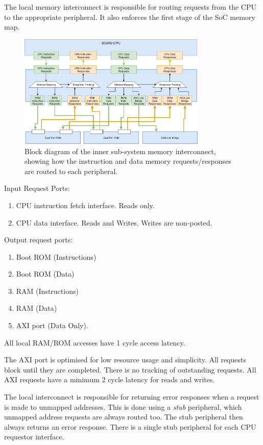 
The local memory interconnect is responsible for routing requests from the
CPU to the appropriate peripheral.
It also enforces the first stage of the SoC memory map.

\begin{figure}
\centering
\includegraphics[width=0.8\textwidth]{image/soc-local-ic.png}
\caption{
Block diagram of the \SCARVSOC inner sub-system memory interconnect, 
showing how the \SCARVCPU instruction and data memory requests/responses
are routed to each peripheral.
}
\label{fig:design:soc-local-ic}
\end{figure}

\noindent Input Request Ports:
\begin{enumerate}

\item CPU instruction fetch interface. Reads only.

\item CPU data interface. Reads and Writes. Writes are non-posted.

\end{enumerate}


\noindent Output request ports:
\begin{enumerate}

\item Boot ROM (Instructions)

\item Boot ROM (Data)

\item RAM (Instructions)

\item RAM (Data)

\item AXI port (Data Only).

\end{enumerate}

All local RAM/ROM accesses have 1 cycle access latency.

The AXI port is optimised for low resource usage and simplicity.
All requests block until they are completed. There is no
tracking of outstanding requests.
All AXI requests have a minimum 2 cycle latency for reads and writes.

The local interconnect is responsible for returning error responses
when a request is made to unmapped addresses.
This is done using a {\em stub} peripheral, which unmapped address
requests are always routed too.
The stub peripheral then always returns an error response.
There is a single stub peripheral for each CPU requestor interface.

